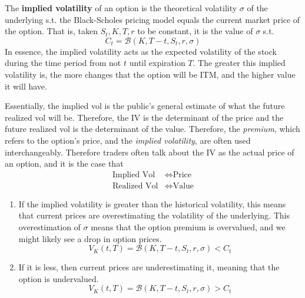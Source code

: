 \documentclass{article}
\begin{document}
    \begin{definition}
      The \textbf{implied volatility} of an option is the theoretical volatility $\sigma$ of the underlying s.t. the Black-Scholes pricing model equals the current market price of the option. That is, taken $S_t, K, T, r$ to be constant, it is the value of $\sigma$ s.t. 
      \begin{equation}
        C_t = \mathcal{B}(K, T - t, S_t, r, \sigma)
      \end{equation}
      In essence, the implied volatility acts as the expected volatility of the stock during the time period from not $t$ until expiration $T$. The greater this implied volatility is, the more changes that the option will be ITM, and the higher value it will have. 
    \end{definition}

    Essentially, the implied vol is the public's general estimate of what the future realized vol will be. Therefore, the IV is the determinant of the price and the future realized vol is the determinant of the value. Therefore, the \textit{premium}, which refers to the option's price, and the \textit{implied volatility}, are often used interchangeably. Therefore traders often talk about the IV as the actual price of an option, and it is the case that 
    \begin{align*}
      \text{Implied Vol} & \iff  \text{Price} \\ 
      \text{Realized Vol} & \iff \text{Value}
    \end{align*}

    \begin{enumerate}
      \item If the implied volatility is greater than the historical volatility, this means that current prices are overestimating the volatility of the underlying. This overestimation of $\sigma$ means that the option premium is overvalued, and we might likely see a drop in option prices. 
      \begin{equation}
        V_K (t, T) = \mathcal{B} (K, T - t, S_t, r, \sigma) < C_t
      \end{equation}

      \item If it is less, then current prices are underestimating it, meaning that the option is undervalued. 
      \begin{equation}
        V_K (t, T) = \mathcal{B} (K, T - t, S_t, r, \sigma) > C_t
      \end{equation}
    \end{enumerate}
\end{document}
